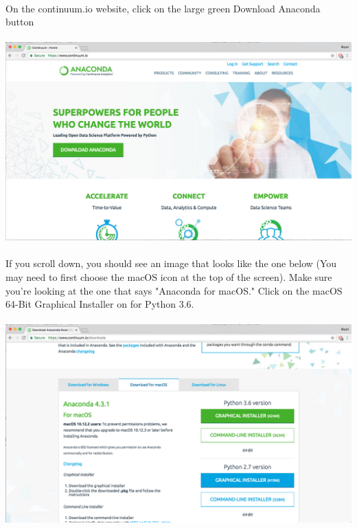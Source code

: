 \documentclass[]{article}
\begin{document}
\paragraph{}
On the continuum.io website, click on the large green Download Anaconda button
\paragraph{}
\begin{centering}
    \centerline{\includegraphics[scale=0.35]{Screenshot_2.png}}
\end{centering}

\paragraph{}
If you scroll down, you should see an image that looks like the one below (You may need to first choose the macOS icon at the top of the screen). Make sure you're looking at the one that says "Anaconda for macOS." Click on the macOS 64-Bit Graphical Installer on for Python 3.6.
\paragraph{}
\begin{centering}
    \centerline{\includegraphics[scale=0.35]{Screenshot_3.png}}
\end{centering}
\end{document}
